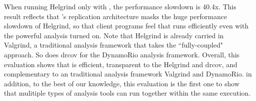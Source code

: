 When running Helgrind only with \clamav, the performance slowdown is 40.4x. This result reflects that \xxx's 
replication architecture masks the huge performance slowdown of Helgrind, so 
that client programs feel that \clamav runs efficiently even with the 
powerful analysis turned on. Note that Helgrind is already carried in Valgrind, 
a traditional analysis framework that takes the ``fully-coupled" approach. So 
does drcov for the DynamoRio analysis framework. Overall, this evaluation shows that \xxx is efficient, transparent to the 
Helgrind and drcov, and complementary to an traditional analysis framework 
Valgrind and DynamoRio. in addition, to the best of our knowledge, this 
evaluation is the first one to show that mulitiple types of analysis tools can 
run together within the same execution.

